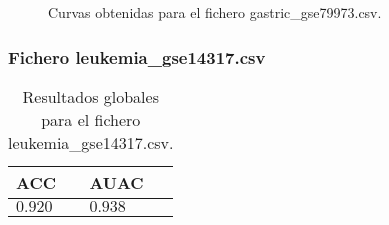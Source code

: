 \clearpage

\begin{figure}[htp]
    \centering
    \caption{Curvas obtenidas para el fichero gastric\_gse79973.csv.}
    \label{fig:14}
\end{figure}

\bigbreak

\lipsum[1]

\clearpage


\subsubsection{Fichero leukemia\_gse14317.csv}

\begin{table}[htp]
    \small
    \centering
    \begin{tabularx}{\columnwidth}{Y Y}
        ACC       & AUAC    \\\hline
        $0.920$   & $0.938$ \\\hline
    \end{tabularx}
    \caption{Resultados globales para el fichero leukemia\_gse14317.csv.}
    \label{tab:20}
\end{table}

